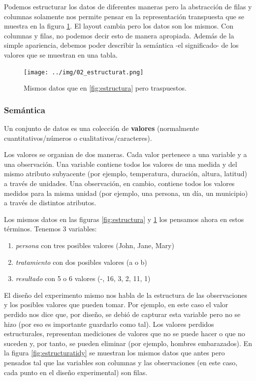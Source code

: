 \documentclass[]{article}
\providecommand{\tightlist}{%
  \setlength{\itemsep}{0pt}\setlength{\parskip}{0pt}}
\begin{document}
Podemos estructurar los datos de diferentes maneras pero la abstracción
de filas y columnas solamente nos permite pensar en la representación
transpuesta que se muestra en la figura \ref{fig:estructurat}. El layout
cambia pero los datos son los mismos. Con columnas y filas, no podemos
decir esto de manera apropiada. Además de la simple apariencia, debemos
poder describir la semántica -el significado- de los valores que se
muestran en una tabla.

\begin{figure}[h]
    \centering
    \texttt{[image: ../img/02\_estructurat.png]}
    \caption{Mismos datos que en \ref{fig:estructura} pero traspuestos.}
    \label{fig:estructurat}
\end{figure}

\subsubsection{Semántica}\label{semantica}

Un conjunto de datos es una colección de \textbf{valores} (normalmente
cuantitativos/números o cualitativos/caracteres).

Los valores se organian de dos maneras. Cada valor pertenece a una
variable y a una observación. Una variable contiene todos los valores de
una medida y del mismo atributo subyacente (por ejemplo, temperatura,
duración, altura, latitud) a través de unidades. Una observación, en
cambio, contiene todos los valores medidos para la misma unidad (por
ejemplo, una persona, un día, un municipio) a través de distintos
atributos.

Los mismos datos en las figuras \ref{fig:estructura} y
\ref{fig:estructurat} los pensamos ahora en estos términos. Tenemos 3
variables:

\begin{enumerate}
\def\labelenumi{\arabic{enumi}.}
\tightlist
\item
  \emph{persona} con tres posibles valores (John, Jane, Mary)
\item
  \emph{tratamiento} con dos posibles valores (a o b)
\item
  \emph{resultado} con 5 o 6 valores (-, 16, 3, 2, 11, 1)
\end{enumerate}

El diseño del experimento mismo nos habla de la estructura de las
observaciones y los posibles valores que pueden tomar. Por ejemplo, en
este caso el valor perdido nos dice que, por diseño, se debió de
capturar esta variable pero no se hizo (por eso es importante guardarlo
como tal). Los valores perdidos estructurales, representan mediciones de
valores que no se puede hacer o que no suceden y, por tanto, se pueden
eliminar (por ejemplo, hombres embarazados). En la figura
\ref{fig:estructuratidy} se muestran los mismos datos que antes pero
pensados tal que las variables son columnas y las observaciones (en este
caso, cada punto en el diseño experimental) son filas.
\end{document}
